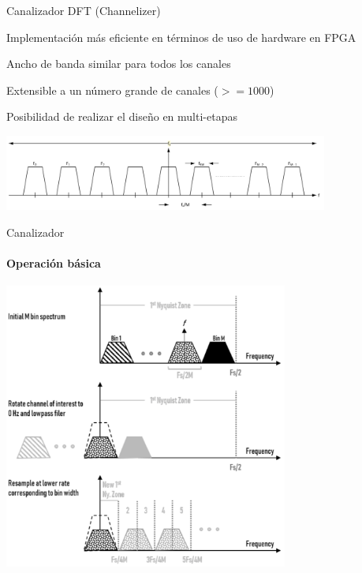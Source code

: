 \documentclass[ignorenonframetext,12pt]{beamer}
\begin{document}
\begin{frame}{Canalizador DFT (Channelizer)}

				Implementación m\'as eficiente en t\'erminos de uso de hardware en FPGA

				Ancho de banda similar para todos los canales 

				Extensible a un n\'umero grande de canales ($>=1000$)

				Posibilidad de realizar el diseño en multi-etapas

				\begin{center}
								\includegraphics[width=0.8\textwidth]{FDM_channel_diagram}
				\end{center}
\end{frame}
\begin{frame}{Canalizador}
				\framesubtitle{Operación básica}
				\centering
								\includegraphics[width=0.7\textwidth]{pfb_basic1}
\end{frame}
\end{document}
